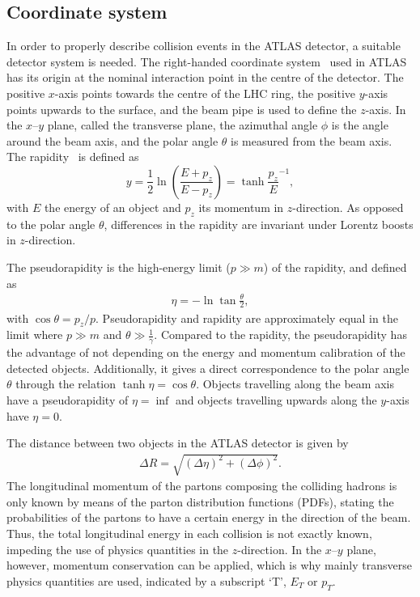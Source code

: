 \subsection{Coordinate system}

In order to properly describe collision events in the ATLAS detector, a suitable detector system is needed. The right-handed coordinate system~\cite{ATLAS:1999uwa} used in ATLAS has its origin at the nominal interaction point in the centre of the detector. The positive $x$-axis points towards the centre of the LHC ring, the positive $y$-axis points upwards to the surface, and the beam pipe is used to define the $z$-axis. In the $x$--$y$ plane, called the transverse plane, the azimuthal angle $\phi$ is the angle around the beam axis, and the polar angle $\theta$ is measured from the beam axis. The rapidity~\cite{pdg2020} is defined as
\begin{equation}
	y = \frac{1}{2}\ln\left(\frac{E+p_z}{E-p_z}\right) = \tanh{\frac{p_z}{E}}^{-1},
\end{equation}
with $E$ the energy of an object and $p_z$ its momentum in $z$-direction. As opposed to the polar angle $\theta$, differences in the rapidity are invariant under Lorentz boosts in $z$-direction.

The pseudorapidity \cite{pdg2020} is the high-energy limit ($p\gg m$) of the rapidity, and defined as
\begin{align}
	\eta = - \ln\tan\frac{\theta}{2},
\end{align}
with $\cos\theta = p_z/p$. Pseudorapidity and rapidity are approximately equal in the limit where $p\gg m$ and $\theta \gg \frac{1}{\gamma}$. Compared to the rapidity, the pseudorapidity has the advantage of not depending on the energy and momentum calibration of the detected objects. Additionally, it gives a direct correspondence to the polar angle $\theta$ through the relation $\tanh\eta = \cos\theta$. Objects travelling along the beam axis have a pseudorapidity of $\eta = \inf$ and objects travelling upwards along the $y$-axis have $\eta = 0$.

The distance between two objects in the ATLAS detector is given by
\begin{align}
	\Delta R=\sqrt{\left(\Delta \eta\right)^2+\left(\Delta \phi\right)^2}.
\end{align}
The longitudinal momentum of the partons composing the colliding hadrons is only known by means of the parton distribution functions (PDFs), stating the probabilities of the partons to have a certain energy in the direction of the beam. Thus, the total longitudinal energy in each collision is not exactly known, impeding the use of physics quantities in the $z$-direction. In the $x$--$y$ plane, however, momentum conservation can be applied, which is why mainly transverse physics quantities are used, indicated by a subscript `T', \eg $E_T$ or $p_T$.

